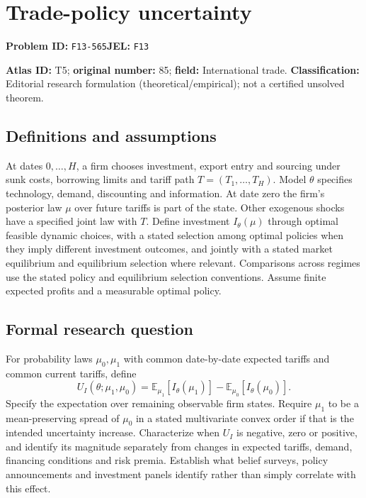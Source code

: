 \documentclass[11pt,a4paper]{article}
\begin{document}
\section*{Trade-policy uncertainty}
\textbf{Problem ID:} \texttt{F13-565}\quad \textbf{JEL:} \texttt{F13}\par
\label{problem:OP-0085}
\label{atlas:prob:T5}

\noindent\textbf{Atlas ID:} T5; \textbf{original number:} 85; \textbf{field:} International trade. \textbf{Classification:} Editorial research formulation (theoretical/empirical); not a certified unsolved theorem.

\subsection*{Definitions and assumptions}
At dates $0,\ldots,H$, a firm chooses investment, export entry and sourcing under sunk costs, borrowing limits and tariff path $T=(T_1,\ldots,T_H)$. Model $\theta$ specifies technology, demand, discounting and information. At date zero the firm’s posterior law $\mu$ over future tariffs is part of the state. Other exogenous shocks have a specified joint law with $T$. Define investment $I_\theta(\mu)$ through optimal feasible dynamic choices, with a stated selection among optimal policies when they imply different investment outcomes, and jointly with a stated market equilibrium and equilibrium selection where relevant. Comparisons across regimes use the stated policy and equilibrium selection conventions. Assume finite expected profits and a measurable optimal policy.

\subsection*{Formal research question}
For probability laws $\mu_0,\mu_1$ with common date-by-date expected tariffs and common current tariffs, define
\[
 U_I(\theta;\mu_1,\mu_0)
 =\mathbb E_{\mu_1}[I_\theta(\mu_1)]
  -\mathbb E_{\mu_0}[I_\theta(\mu_0)].
\]
Specify the expectation over remaining observable firm states. Require $\mu_1$ to be a mean-preserving spread of $\mu_0$ in a stated multivariate convex order if that is the intended uncertainty increase. Characterize when $U_I$ is negative, zero or positive, and identify its magnitude separately from changes in expected tariffs, demand, financing conditions and risk premia. Establish what belief surveys, policy announcements and investment panels identify rather than simply correlate with this effect.
\end{document}
